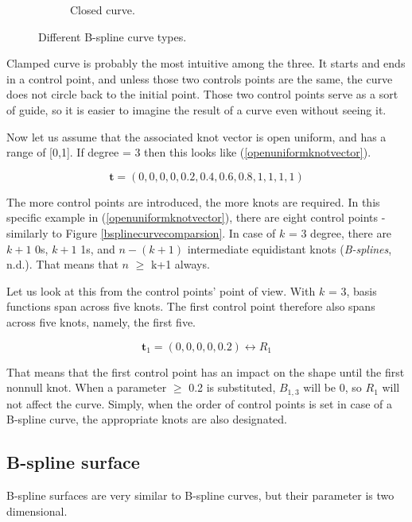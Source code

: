 \documentclass{article}
\begin{document}
\begin{figure}[H]
\begin{subfigure}[b]{0.32\textwidth}
\caption{Closed curve.}
\label{closed}
\end{subfigure}
\caption{Different B-spline curve types.}
\label{curvetypes}
\end{figure}

Clamped curve is probably the most intuitive among the three. It starts and ends in a control point, and unless those two controls points are the same, the curve does not circle back to the initial point. Those two control points serve as a sort of guide, so it is easier to imagine the result of a curve even without seeing it.

\vspace{6pt}
Now let us assume that the associated knot vector is open uniform, and has a range of [0,1]. If degree = 3 then this looks like (\ref{openuniformknotvector}).

\begin{equation}
\mathbf{t} = (0, 0, 0, 0, 0.2, 0.4, 0.6, 0.8, 1, 1, 1, 1)
\label{openuniformknotvector}
\end{equation}

The more control points are introduced, the more knots are required. In this specific example in (\ref{openuniformknotvector}), there are eight control points - similarly to Figure \ref{bsplinecurvecomparsion}. In case of $k$ = 3 degree, there are $k+1$ 0s, $k+1$ 1s, and $n-(k+1)$ intermediate equidistant knots (\emph{B-splines}, n.d.). That means that $n$ $\geq$ k+1 always.

Let us look at this from the control points' point of view. With $k$ = 3, basis functions span across five knots. The first control point therefore also spans across five knots, namely, the first five.

\begin{equation}
\mathbf{t}_1 = (0, 0, 0, 0, 0.2) \longleftrightarrow R_1
\end{equation}

That means that the first control point has an impact on the shape until the first nonnull knot. When a parameter $\geq$ 0.2 is substituted, $B_{1,3}$ will be 0, so $R_1$ will not affect the curve.
Simply, when the order of control points is set in case of a B-spline curve, the appropriate knots are also designated.

\subsection{B-spline surface}

\vspace{6pt}
B-spline surfaces are very similar to B-spline curves, but their parameter is two dimensional.
\end{document}
